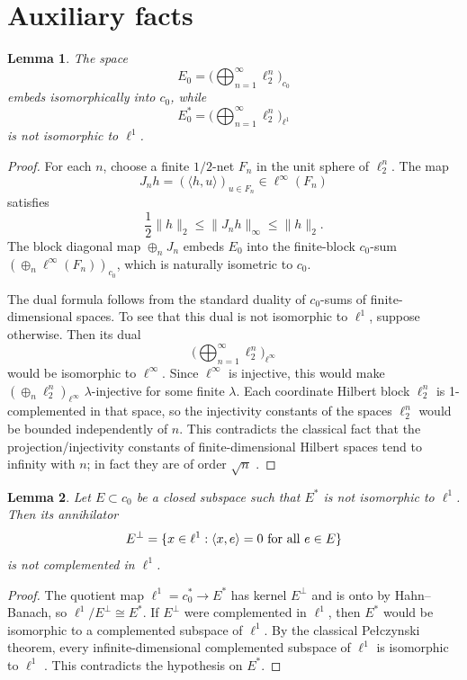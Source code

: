 \documentclass[11pt]{article}
\newtheorem{lemma}{Lemma}
\newcommand{\ellone}{\ell^1}
\newcommand{\Hn}{\ell_2^n}
\newcommand{\ellinf}{\ell^\infty}
\newcommand{\cnull}{c_0}
\begin{document}
\section*{Auxiliary facts}

\begin{lemma}\label{lem:block}
The space
\[
        E_0=\Big(\bigoplus_{n=1}^\infty \Hn\Big)_{\cnull}
\]
embeds isomorphically into $\cnull$, while
\[
        E_0^*=\Big(\bigoplus_{n=1}^\infty \Hn\Big)_{\ellone}
\]
is not isomorphic to $\ellone$.
\end{lemma}

\begin{proof}
For each $n$, choose a finite $1/2$-net $F_n$ in the unit sphere of
$\Hn$.  The map
\[
        J_n h=(\langle h,u\rangle)_{u\in F_n}\in \ellinf(F_n)
\]
satisfies
\[
        \frac12\|h\|_2\leq \|J_nh\|_\infty\leq \|h\|_2.
\]
The block diagonal map $\oplus_n J_n$ embeds $E_0$ into the finite-block
$\cnull$-sum $\left(\oplus_n\ellinf(F_n)\right)_{\cnull}$, which is naturally
isometric to $\cnull$.

The dual formula follows from the standard duality of $\cnull$-sums of
finite-dimensional spaces.  To see that this dual is not isomorphic to
$\ellone$, suppose otherwise.  Then its dual
\[
        \Big(\bigoplus_{n=1}^\infty \Hn\Big)_{\ellinf}
\]
would be isomorphic to $\ellinf$.  Since $\ellinf$ is injective, this would make
$\left(\oplus_n \Hn\right)_{\ellinf}$ $\lambda$-injective for some
finite $\lambda$.  Each coordinate Hilbert block $\Hn$ is
1-complemented in that space, so the injectivity constants of the spaces
$\Hn$ would be bounded independently of $n$.  This contradicts the
classical fact that the projection/injectivity constants of finite-dimensional
Hilbert spaces tend to infinity with $n$; in fact they are of order
$\sqrt n$ \cite{Grunbaum,LT}.
\end{proof}

\begin{lemma}\label{lem:comp}
Let $E\subset \cnull$ be a closed subspace such that $E^*$ is not isomorphic to
$\ellone$.  Then its annihilator
\[
        E^\perp=\{x\in \ellone:\langle x,e\rangle=0\hbox{ for all }e\in E\}
\]
is not complemented in $\ellone$.
\end{lemma}

\begin{proof}
The quotient map $\ellone=\cnull^*\to E^*$ has kernel $E^\perp$ and is onto by
Hahn--Banach, so $\ellone/E^\perp\cong E^*$.  If $E^\perp$ were complemented in
$\ellone$, then $E^*$ would be isomorphic to a complemented subspace of
$\ellone$.  By the classical Pe\l czynski theorem, every infinite-dimensional
complemented subspace of $\ellone$ is isomorphic to $\ellone$ \cite{LT}.  This
contradicts the hypothesis on $E^*$.
\end{proof}
\end{document}
